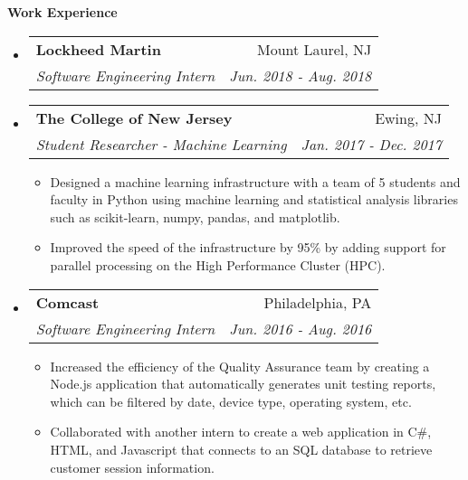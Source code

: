 \documentclass[letterpaper,11pt]{article}
\makeatletter
\newcommand{\resitem}[1]{\item #1 \vspace{-2pt}}
\newcommand{\resheading}[1]{{\large \colorbox{mygrey}{\begin{minipage}{\textwidth}{\textbf{#1 \vphantom{p\^{E}}}}\end{minipage}}}}
\newcommand{\ressubheading}[4]{
\begin{tabular*}{7.0in}{l@{\extracolsep{\fill}}r}
		\textbf{#1} & #2 \\
		\textit{#3} & \textit{#4} \\
\end{tabular*}\vspace{-6pt}}
\makeatother
\begin{document}
\resheading{Work Experience}
\begin{itemize}

\item
	\ressubheading{Lockheed Martin}{Mount Laurel, NJ}{Software Engineering Intern}{Jun. 2018 - Aug. 2018}
\item
	\ressubheading{The College of New Jersey}{Ewing, NJ}{Student Researcher - Machine Learning}{Jan. 2017 - Dec. 2017}
	\begin{itemize}
		\resitem{Designed a machine learning infrastructure with a team of 5 students and faculty in Python using machine learning and statistical analysis libraries such as scikit-learn, numpy, pandas, and matplotlib.}
		\resitem{Improved the speed of the infrastructure by 95\% by adding support for parallel processing on the High Performance Cluster (HPC).}
		\end{itemize}
		
\item
	\ressubheading{Comcast}{Philadelphia, PA}{Software Engineering Intern}{Jun. 2016 - Aug. 2016}
	\begin{itemize}
		\resitem{Increased the efficiency of the Quality Assurance team by creating a Node.js application that automatically generates unit testing reports, which can be filtered by date, device type, operating system, etc.}
		\resitem{Collaborated with another intern to create a web application in C\#, HTML, and Javascript that connects to an SQL database to retrieve customer session information.}
	\end{itemize}
\end{itemize}
\end{document}
